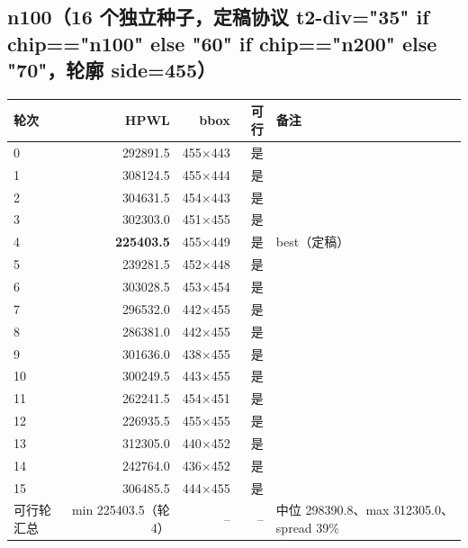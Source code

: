 \documentclass[12pt,a4paper]{article}
\begin{document}
\subsection{n100（16 个独立种子，定稿协议 t2-div={"35" if chip=="n100" else "60" if chip=="n200" else "70"}，轮廓 side=455）}
\begin{table}[H]
\centering
\scriptsize
\setlength{\tabcolsep}{2.5pt}
\begin{tabular}{lrrrl}
\toprule
轮次 & HPWL & bbox & 可行 & 备注 \\
\midrule
0 & 292891.5 & 455×443 & 是 &  \\
1 & 308124.5 & 455×444 & 是 &  \\
2 & 304631.5 & 454×443 & 是 &  \\
3 & 302303.0 & 451×455 & 是 &  \\
4 & \textbf{225403.5} & 455×449 & 是 & best（定稿） \\
5 & 239281.5 & 452×448 & 是 &  \\
6 & 303028.5 & 453×454 & 是 &  \\
7 & 296532.0 & 442×455 & 是 &  \\
8 & 286381.0 & 442×455 & 是 &  \\
9 & 301636.0 & 438×455 & 是 &  \\
10 & 300249.5 & 443×455 & 是 &  \\
11 & 262241.5 & 454×451 & 是 &  \\
12 & 226935.5 & 455×455 & 是 &  \\
13 & 312305.0 & 440×452 & 是 &  \\
14 & 242764.0 & 436×452 & 是 &  \\
15 & 306485.5 & 444×455 & 是 &  \\
\midrule
可行轮汇总 & min 225403.5（轮 4） & -- & -- & 中位 298390.8、max 312305.0、spread 39\% \\
\bottomrule
\end{tabular}
\end{table}
\end{document}
